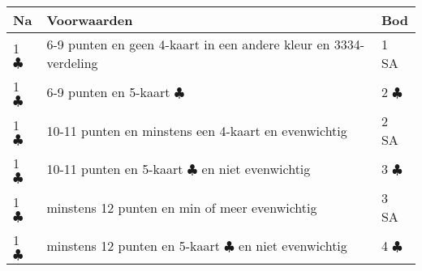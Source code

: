 \documentclass[12pt,a4paper]{report}
\begin{document}
\begin{tabular}{|l|p{5cm}|l|}
	\hline 
	\textbf{Na} &\textbf{Voorwaarden}  &\textbf{Bod}  \\ 
	\hline 
	
	1 $\clubsuit$	   
	&6-9 punten\newline
	en geen 4-kaart in een andere kleur\newline
	en 3334-verdeling
	& 1 SA \\ 
	\hline 
	
	1 $\clubsuit$
	&6-9 punten\newline
	en 5-kaart $\clubsuit$
	&  2 $\clubsuit$ \\ 
	\hline 
	
	1 $\clubsuit$
	&10-11 punten\newline
	en minstens een 4-kaart \newline
	en evenwichtig
	& 2 SA \\ 
	\hline 
	
	1 $\clubsuit$
	&10-11 punten\newline
	en  5-kaart $\clubsuit$ \newline
	en niet evenwichtig
	&  3 $\clubsuit$ \\ 
	\hline 
	
	1 $\clubsuit$
	&minstens 12 punten \newline
	en min of meer evenwichtig
	& 3 SA\\ 
	\hline 
	
	1 $\clubsuit$
	&minstens 12 punten \newline
	en 5-kaart  $\clubsuit$ \newline
	en niet evenwichtig
	& 4 $\clubsuit$ \\ 
	\hline 
\end{tabular}

\newpage 
\end{document}
